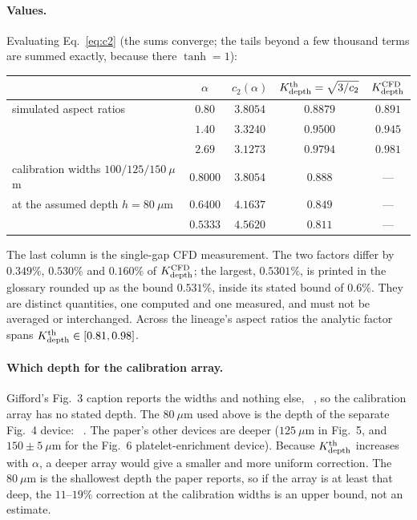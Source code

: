 \paragraph{Values.} Evaluating Eq.~\eqref{eq:c2} (the sums converge; the tails beyond a few
thousand terms are summed exactly, because there $\tanh=1$):
\begin{center}
\small
\begin{tabular}{@{}lcccc@{}}
\toprule
& $\alpha$ & $c_2(\alpha)$ & $K_{\mathrm{depth}}^{\mathrm{th}}=\sqrt{3/c_2}$ & $K_{\mathrm{depth}}^{\mathrm{CFD}}$ \\
\midrule
simulated aspect ratios & $0.80$ & $3.8054$ & $0.8879$ & $0.891$ \\
& $1.40$ & $3.3240$ & $0.9500$ & $0.945$ \\
& $2.69$ & $3.1273$ & $0.9794$ & $0.981$ \\
\midrule
calibration widths $100/125/150~\mu$m & $0.8000$ & $3.8054$ & $0.888$ & --- \\
at the assumed depth $h=80~\mu$m & $0.6400$ & $4.1637$ & $0.849$ & --- \\
& $0.5333$ & $4.5620$ & $0.811$ & --- \\
\bottomrule
\end{tabular}
\end{center}
The last column is the single-gap CFD measurement. The two factors differ by $0.349\%$,
$0.530\%$ and $0.160\%$ of $K_{\mathrm{depth}}^{\mathrm{CFD}}$; the largest, $0.5301\%$, is printed in the glossary rounded up as the bound
$0.531\%$, inside its stated bound of
$0.6\%$. They are distinct quantities, one computed and one measured, and must not be averaged
or interchanged. Across the lineage's aspect ratios the analytic factor spans
$K_{\mathrm{depth}}^{\mathrm{th}}\in[0.81,0.98]$.

\paragraph{Which depth for the calibration array.} Gifford's Fig.~3 caption reports the widths
and nothing else, ~\cite[p.~4500, Fig.~3 caption]{b1},
so the calibration array has no stated depth. The $80~\mu$m used above is the depth of the
separate Fig.~4 device: ~\cite[p.~4500, Fig.~4 caption]{b1}.
The paper's other devices are deeper ($125~\mu$m in Fig.~5, and $150\pm5~\mu$m for the
Fig.~6 platelet-enrichment device). Because $K_{\mathrm{depth}}^{\mathrm{th}}$ increases with $\alpha$, a deeper array would give a
smaller and more uniform correction. The $80~\mu$m is the shallowest depth the paper reports, so
if the array is at least that deep, the $11$--$19\%$ correction at the calibration widths is an
upper bound, not an estimate.

